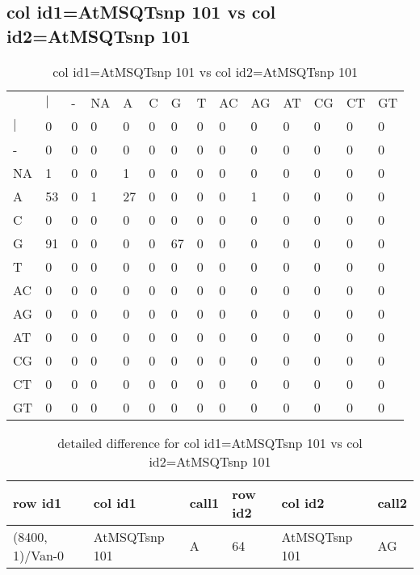 \subsection{col id1=AtMSQTsnp 101 vs col id2=AtMSQTsnp 101}
\begin{center}
\begin{longtable}{|l|l|l|l|l|l|l|l|l|l|l|l|l|l|}
\caption{col id1=AtMSQTsnp 101 vs col id2=AtMSQTsnp 101} \label{table_dm490}\\
\hline
\\
\hline
&$|$&-&NA&A&C&G&T&AC&AG&AT&CG&CT&GT\\
$|$&0&0&0&0&0&0&0&0&0&0&0&0&0\\
-&0&0&0&0&0&0&0&0&0&0&0&0&0\\
NA&1&0&0&1&0&0&0&0&0&0&0&0&0\\
A&53&0&1&27&0&0&0&0&1&0&0&0&0\\
C&0&0&0&0&0&0&0&0&0&0&0&0&0\\
G&91&0&0&0&0&67&0&0&0&0&0&0&0\\
T&0&0&0&0&0&0&0&0&0&0&0&0&0\\
AC&0&0&0&0&0&0&0&0&0&0&0&0&0\\
AG&0&0&0&0&0&0&0&0&0&0&0&0&0\\
AT&0&0&0&0&0&0&0&0&0&0&0&0&0\\
CG&0&0&0&0&0&0&0&0&0&0&0&0&0\\
CT&0&0&0&0&0&0&0&0&0&0&0&0&0\\
GT&0&0&0&0&0&0&0&0&0&0&0&0&0\\
\hline
\end{longtable}
\end{center}

\begin{center}
\begin{longtable}{|l|l|l|l|l|l|}
\caption{detailed difference for col id1=AtMSQTsnp 101 vs col id2=AtMSQTsnp 101} \label{table_dm491}\\
\hline
row id1&col id1&call1&row id2&col id2&call2\\
\hline
(8400, 1)/Van-0&AtMSQTsnp 101&A&64&AtMSQTsnp 101&AG\\
\hline
\end{longtable}
\end{center}

